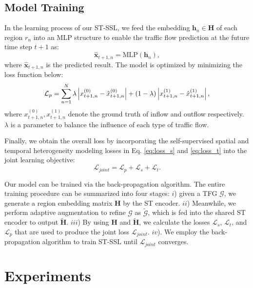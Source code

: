 \documentclass[letterpaper]{article} \usepackage{aaai23}  \usepackage{times}  \usepackage{helvet}  \usepackage{courier}  \usepackage[hyphens]{url}  \usepackage{graphicx} \urlstyle{rm} \def\UrlFont{\rm}  \usepackage{natbib}  \usepackage{caption} \frenchspacing  \setlength{\pdfpagewidth}{8.5in} \setlength{\pdfpageheight}{11in}
\newcommand{\name}{ST-SSL\xspace}
\begin{document}
\subsection{Model Training}

In the learning process of our \name, we feed the embedding $\bm h_n \in \bm H$ of each region $r_n$ into an MLP structure to enable the traffic flow prediction at the future time step $t+1$ as:
\begin{equation}
    \hat{\bm x}_{t+1, n} = \mathrm{MLP}(\bm h_n),
\end{equation}
\noindent where $\hat{\bm x}_{t+1, n}$ is the predicted result. The model is optimized by minimizing the loss function below:
\begin{equation}\label{eq:loss_p}\small
    \mathcal{L}_p = \sum_{n=1}^{N} \lambda \left|x_{t+1,n}^{(0)} - \hat{x}_{t+1,n}^{(0)}\right|+ (1-\lambda) \left|x_{t+1,n}^{(1)} - \hat{x}_{t+1,n}^{(1)}\right|,
\end{equation}
where $x_{t+1,n}^{(0)}, x_{t+1,n}^{(1)}$ denote the ground truth of inflow and outflow respectively. $\lambda$ is a parameter to balance the influence of each type of traffic flow.



Finally, we obtain the overall loss by incorporating the self-supervised spatial and temporal heterogeneity modeling losses in Eq. \eqref{eq:loss_s} and \eqref{eq:loss_t} into the joint learning objective:
\begin{equation}
    \mathcal{L}_{joint} = \mathcal{L}_p + \mathcal{L}_s + \mathcal{L}_t.
\end{equation}

Our model can be trained via the back-propagation algorithm. The entire training procedure can be summarized into four stages: $i$) given a TFG $\mathcal{G}$, we generate a region embedding matrix $\bm H$ by the ST encoder. $ii$) Meanwhile, we perform adaptive augmentation to refine $\mathcal{G}$ as $\tilde{\mathcal{G}}$, which is fed into the shared ST encoder to output $\tilde{\bm H}$. $iii$) By using $\bm H$ and $\tilde{\bm H}$, we calculate the losses $\mathcal{L}_s$, $\mathcal{L}_t$, and $\mathcal{L}_p$ that are used to produce the joint loss $\mathcal{L}_{joint}$. $iv$). We employ the back-propagation algorithm to train \name until $\mathcal{L}_{joint}$ converges.

\section{Experiments}\label{sec:expt}
\end{document}
